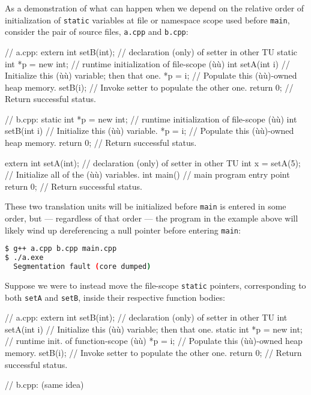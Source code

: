 As a demonstration of what can happen when we depend on the relative
order of initialization of \lstinline!static! variables at file or
namespace scope used before \lstinline!main!, consider the
 pair of source files, \lstinline!a.cpp! and
\lstinline!b.cpp!:

\begin{emcppslisting}
// a.cpp:
extern int setB(int);      // declaration (only) of setter in other TU
static int *p = new int;   // runtime initialization of file-scope (ù{}ù)
int setA(int i)            // Initialize this (ù{}ù) variable; then that one.
{
    *p = i;                // Populate this (ù{}ù)-owned heap memory.
    setB(i);               // Invoke setter to populate the other one.
    return 0;              // Return successful status.
}

// b.cpp:
static int *p = new int;   // runtime initialization of file-scope (ù{}ù)
int setB(int i)            // Initialize this (ù{}ù) variable.
{
    *p = i;                // Populate this (ù{}ù)-owned heap memory.
    return 0;              // Return successful status.
}

extern int setA(int);      // declaration (only) of setter in other TU
int x = setA(5);           // Initialize all of the (ù{}ù) variables.
int main()                 // main program entry point
{
    return 0;              // Return successful status.
}
\end{emcppslisting}

\noindent These two translation units will be initialized before \lstinline!main! is
entered in some order, but --- regardless of that order --- the program
in the example above will likely wind up dereferencing a null pointer
before entering \lstinline!main!:

\begin{lstlisting}[language=bash]
$ g++ a.cpp b.cpp main.cpp
$ ./a.exe
  Segmentation fault (core dumped)
\end{lstlisting}

\noindent Suppose we were to instead move the file-scope \lstinline!static! pointers,
corresponding to both \lstinline!setA! and \lstinline!setB!, inside their
respective function bodies:

\begin{emcppslisting}
// a.cpp:
extern int setB(int);  // declaration (only) of setter in other TU
int setA(int i)        // Initialize this (ù{}ù) variable; then that one.
{
    static int *p = new int;  // runtime init. of function-scope (ù{}ù)
    *p = i;                   // Populate this (ù{}ù)-owned heap memory.
    setB(i);                  // Invoke setter to populate the other one.
    return 0;                 // Return successful status.
}

// b.cpp: (same idea)
\end{emcppslisting}

